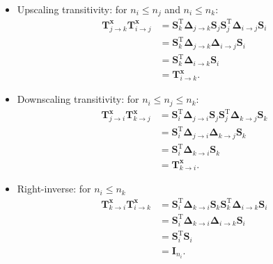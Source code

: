 \documentclass[npg, manuscript]{copernicus}
\begin{document}
\begin{itemize}
\item Upscaling transitivity: for $n_i \le n_j$ and $n_i \le n_k$:
\begin{align}
\mathbf{T}^\mathbf{x}_{j \rightarrow k} \mathbf{T}^\mathbf{x}_{i \rightarrow j} & = \mathbf{S}^\mathrm{T}_k \boldsymbol{\Delta}_{j \rightarrow k} \mathbf{S}_j \mathbf{S}^\mathrm{T}_j  \boldsymbol{\Delta}_{i \rightarrow j} \mathbf{S}_i \nonumber \\
& = \mathbf{S}^\mathrm{T}_k \boldsymbol{\Delta}_{j \rightarrow k} \boldsymbol{\Delta}_{i \rightarrow j} \mathbf{S}_i \nonumber \\
& = \mathbf{S}^\mathrm{T}_k \boldsymbol{\Delta}_{i \rightarrow k} \mathbf{S}_i \nonumber \\
& = \mathbf{T}^\mathbf{x}_{i \rightarrow k}.
\end{align}
\item Downscaling transitivity: for $n_i \le n_j \le n_k$:
\begin{align}
\mathbf{T}^\mathbf{x}_{j \rightarrow i} \mathbf{T}^\mathbf{x}_{k \rightarrow j} & = \mathbf{S}^\mathrm{T}_i \boldsymbol{\Delta}_{j \rightarrow i} \mathbf{S}_j \mathbf{S}^\mathrm{T}_j \boldsymbol{\Delta}_{k \rightarrow j} \mathbf{S}_k \nonumber \\
& = \mathbf{S}^\mathrm{T}_i \boldsymbol{\Delta}_{j \rightarrow i} \boldsymbol{\Delta}_{k \rightarrow j} \mathbf{S}_k \nonumber \\
& = \mathbf{S}^\mathrm{T}_i \boldsymbol{\Delta}_{k \rightarrow i} \mathbf{S}_k \nonumber \\
& = \mathbf{T}^\mathbf{x}_{k \rightarrow i}.
\end{align}
\item Right-inverse: for $n_i \le n_k$
\begin{align}
\mathbf{T}^\mathbf{x}_{k \rightarrow i} \mathbf{T}^\mathbf{x}_{i \rightarrow k} & = \mathbf{S}^\mathrm{T}_i \boldsymbol{\Delta}_{k \rightarrow i} \mathbf{S}_k \mathbf{S}^\mathrm{T}_k \boldsymbol{\Delta}_{i \rightarrow k} \mathbf{S}_i \nonumber \\
& = \mathbf{S}^\mathrm{T}_i \boldsymbol{\Delta}_{k \rightarrow i} \boldsymbol{\Delta}_{i \rightarrow k} \mathbf{S}_i \nonumber \\
& = \mathbf{S}^\mathrm{T}_i \mathbf{S}_i \nonumber \\
& = \mathbf{I}_{n_i}.
\end{align}
\end{itemize}
\end{document}
